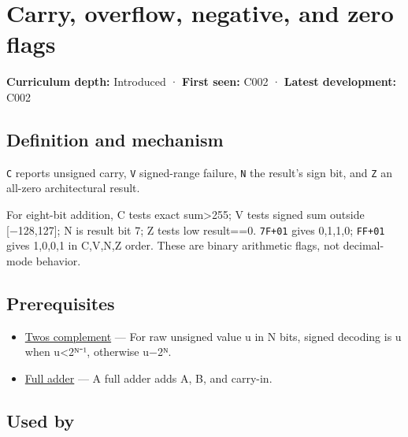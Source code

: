 \hypertarget{appendix-8d687c9c08ab}{}\label{referencestart:appendix-8d687c9c08ab}
\section{Carry, overflow, negative, and zero flags}\label{appendix-8d687c9c08ab-carry-overflow-negative-and-zero-flags}

\textbf{Curriculum depth:} Introduced · \textbf{First seen:} C002 · \textbf{Latest development:} C002

\begin{allmightroledefinition}

\subsection{Definition and mechanism}\label{appendix-8d687c9c08ab-definition-and-mechanism}

\texttt{C} reports unsigned carry, \texttt{V} signed-range failure, \texttt{N} the result's sign bit, and \texttt{Z} an all-zero architectural result.

\end{allmightroledefinition}

For eight-bit addition, C tests exact sum\textgreater255; V tests signed sum outside {[}−128,127{]}; N is result bit 7; Z tests low result==0. \texttt{7F+01} gives 0,1,1,0; \texttt{FF+01} gives 1,0,0,1 in C,V,N,Z order. These are binary arithmetic flags, not decimal-mode behavior.

\subsection{Prerequisites}\label{appendix-8d687c9c08ab-prerequisites}

\begin{itemize}
\tightlist
\item
  \hyperref[appendix-4fbc03d20829]{Two\textquotesingle s complement} --- For raw unsigned value u in N bits, signed decoding is u when u\textless2ᴺ⁻¹, otherwise u−2ᴺ.
\item
  \hyperref[appendix-d1a5b1e520c2]{Full adder} --- A full adder adds A, B, and carry-in.
\end{itemize}

\subsection{Used by}\label{appendix-8d687c9c08ab-used-by}

